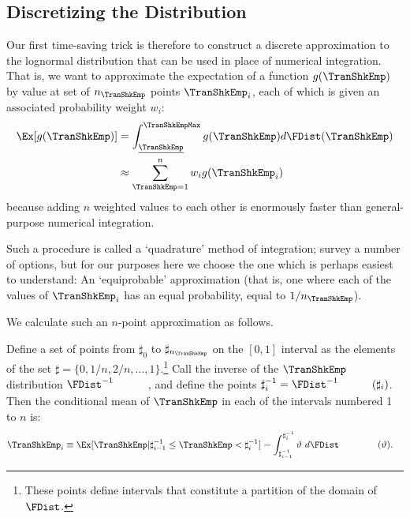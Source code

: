 \documentclass[titlepage, headings=optiontotocandhead]{\econtex}
\begin{document}
\subsection{Discretizing the Distribution}
Our first time-saving trick is therefore to construct a discrete approximation to the lognormal distribution that can be used in place of numerical integration.  That is, we want to approximate the expectation of a function $g(\TranShkEmp)$ by value at set of $n_{\TranShkEmp}$ points $\TranShkEmp_{i}$, each of which is given an associated probability weight $w_{i}$:
\begin{equation*}\begin{gathered}\begin{aligned}
      \Ex[g(\TranShkEmp)] & = \int_{\TranShkEmpMin}^{\TranShkEmpMax}g(\TranShkEmp)d\FDist(\TranShkEmp) \\
      & \approx \sum_{\TranShkEmp = 1}^{n}w_{i}g(\TranShkEmp_{i})
    \end{aligned}\end{gathered}\end{equation*}
because adding $n$ weighted values to each other is enormously faster than general-purpose numerical integration.

Such a procedure is called a `quadrature' method of integration; \cite{Tanaka2013-bc} survey a number of options, but for our purposes here we choose the one which is perhaps easiest to understand: An `equiprobable' approximation (that is, one where each of the values of $\TranShkEmp_{i}$ has an equal probability, equal to $1/n_{\TranShkEmp}$).

We calculate such an $n$-point approximation as follows.

Define a set of points from $\sharp_{0}$ to $\sharp_{n_{\TranShkEmp}}$ on the $[0,1]$ interval
as the elements of the set $\sharp = \{0,1/n,2/n, \ldots,1\}$.\footnote{These points define intervals that constitute a partition of the domain of $\FDist$.}  Call the inverse of the $\TranShkEmp$ distribution $\FDist^{-1}_{\phantom{\TranShkEmp}}$, and define the
points $\sharp^{-1}_{i} = \FDist^{-1}_{\phantom{\TranShkEmp}}(\sharp_{i})$.  Then
the conditional mean of $\TranShkEmp$ in each of the intervals numbered 1 to $n$ is:
\begin{equation}\begin{gathered}\begin{aligned}
      \TranShkEmp_{i} \equiv \Ex[\TranShkEmp | \sharp_{i-1}^{-1} \leq \TranShkEmp < \sharp_{i}^{-1}]  & = \int_{\sharp^{-1}_{i-1}}^{\sharp^{-1}_{i}} \vartheta ~ d\FDist_{\phantom{\TranShkEmp}}(\vartheta)  .
    \end{aligned}\end{gathered}\end{equation}
\end{document}
